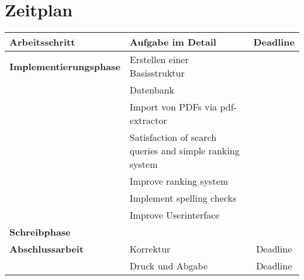 \documentclass[
a4paper,     %
12pt         %
]{scrartcl}  %
\begin{document}



\nocite{*}

\section{Zeitplan}


\begin{tabular}{ | l | l | c | }
  \hline
  \rowcolor{lightblue}
  \textbf{Arbeitsschritt} & \textbf{Aufgabe im Detail} & \textbf{Deadline} \\ \hline
  \textbf{Implementierungsphase} & Erstellen einer Basisstruktur & \\ \hline
    & Datenbank & \\ \hline
    & Import von PDFs via pdf-extractor & \\ \hline
    & Satisfaction of search queries and simple ranking system & \\ \hline
    & Improve ranking system & \\ \hline
    & Implement spelling checks & \\ \hline
    & Improve Userinterface & \\ \hline
  \textbf{Schreibphase} &  & \\ \hline
  \textbf{Abschlussarbeit} & Korrektur & Deadline \\ \hline
    & Druck und Abgabe & Deadline \\ \hline
\end{tabular}


\end{document}
